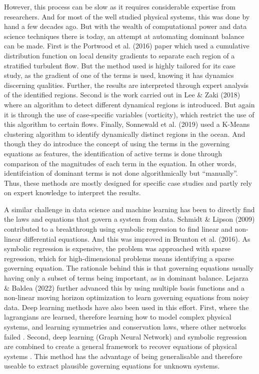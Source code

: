 \documentclass[12pt]{report} %
\begin{document}
However, this process can be slow as it requires considerable expertise from researchers. And for most of the well studied physical systems, this was done by hand a few decades ago. But with the wealth of computational power and data science techniques there is today, an attempt at automating dominant balance can be made. First is the Portwood et al. (2016)\cite{portwood2016robust} paper which used a cumulative distribution function on local density gradients to separate each region of a stratified turbulent flow. But the method used is highly tailored for its case study, as the gradient of one of the terms is used, knowing it has dynamics discerning qualities. Further, the results are interpreted through expert analysis of the identified regions. Second is the work carried out in Lee \& Zaki (2018)\cite{lee2018detection} where an algorithm to detect different dynamical regions is introduced. But again it is through the use of case-specific variables (vorticity), which restrict the use of this algorithm to certain flows. Finally, Sonnewald et al. (2019)\cite{sonnewald2019unsupervised} used a K-Means clustering algorithm to identify dynamically distinct regions in the ocean. And though they do introduce the concept of using the terms in the governing equations as features, the identification of active terms is done through comparison of the magnitudes of each term in the equation. In other words, identifciation of dominant terms is not done algorithmically but ``manually''. Thus, these methods are mostly designed for specific case studies and partly rely on expert knowledge to interpret the results.

\vspace{5mm}

A similar challenge in data science and machine learning has been to directly find the laws and equations that govern a system from data. Schmidt \& Lipson (2009)\cite{schmidt2009distilling} contributed to a breakthrough using symbolic regression to find linear and non-linear differential equations. And this was improved in Brunton et al. (2016)\cite{brunton2016discovering}. As symbolic regression is expensive, the problem was approached with sparse regression, which for high-dimensional problems means identifying a sparse governing equation. The rationale behind this is that governing equations usually having only a subset of terms being important, as in dominant balance. Lejarza \& Baldea (2022) further advanced this by using multiple basis functions and a non-linear moving horizon optimization to learn governing equations from noisy data. Deep learning methods have also been used in this effort. First, where the lagrangians are learned, therefore learning how to model complex physical systems, and learning symmetries and conservation laws, where other networks failed \cite{cranmer2020discovering}. Second, deep learning (Graph Neural Network) and symbolic regression are combined to create a general framework to recover equations of physical systems \cite{cranmer2020lagrangian}. This method has the advantage of being generalisable and therefore useable to extract plausible governing equations for unknown systems.
\end{document}
